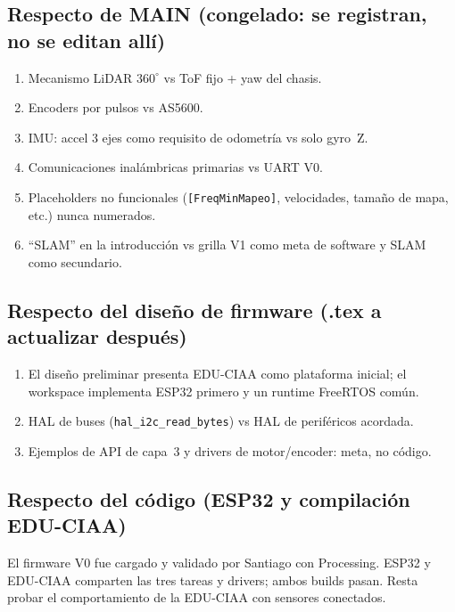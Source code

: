 \documentclass[11pt,a4paper]{article}
\begin{document}
\subsection{Respecto de MAIN (congelado: se registran, no se editan all\'i)}

\begin{enumerate}
  \item Mecanismo LiDAR $360^\circ$ vs ToF fijo + yaw del chasis.
  \item Encoders por pulsos vs AS5600.
  \item IMU: accel 3 ejes como requisito de odometr\'ia vs solo gyro~Z.
  \item Comunicaciones inal\'ambricas primarias vs UART V0.
  \item Placeholders no funcionales (\texttt{[FreqMinMapeo]}, velocidades,
        tama\~no de mapa, etc.) nunca numerados.
  \item ``SLAM'' en la introducci\'on vs grilla V1 como meta de software
        y SLAM como secundario.
\end{enumerate}

\subsection{Respecto del dise\~no de firmware (.tex a actualizar despu\'es)}

\begin{enumerate}
  \item El dise\~no preliminar presenta EDU-CIAA como plataforma inicial;
        el workspace implementa ESP32 primero y un runtime FreeRTOS com\'un.
  \item HAL de buses (\texttt{hal\_i2c\_read\_bytes}) vs HAL de perif\'ericos
        acordada.
  \item Ejemplos de API de capa~3 y drivers de motor/encoder: meta, no c\'odigo.
\end{enumerate}

\subsection{Respecto del c\'odigo (ESP32 y compilaci\'on EDU-CIAA)}

El firmware V0 fue cargado y validado por Santiago con Processing. ESP32 y
EDU-CIAA comparten las tres tareas y drivers; ambos builds pasan. Resta probar
el comportamiento de la EDU-CIAA con sensores conectados.
\end{document}
